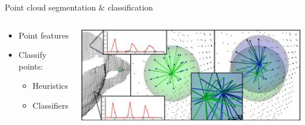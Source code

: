 \documentclass[compress]{beamer}
\begin{document}
\begin{frame}{Point cloud segmentation \& classification}

\begin{columns}[T]
\begin{column}{0.5\textwidth}

\begin{itemize}
\item Point features
\item Classify points:
\begin{itemize}
\item Heuristics
\item Classifiers
\end{itemize}
\end{itemize}

\end{column}

\begin{column}{0.5\textwidth}

\includegraphics[width=1\textwidth]{pics/features.png}

\end{column}
\end{columns}
\end{frame}
\end{document}
